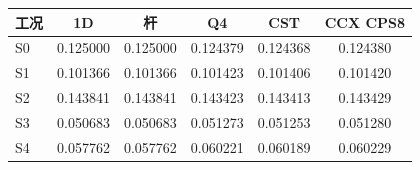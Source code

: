 \begin{tabular}{@{}lS[table-format=1.6]S[table-format=1.6]S[table-format=1.6]S[table-format=1.6]S[table-format=1.6]@{}}
\toprule
工况 & {1D} & {杆} & {Q4} & {CST} & {CCX CPS8} \\
\midrule
S0 & 0.125000 & 0.125000 & 0.124379 & 0.124368 & 0.124380 \\
S1 & 0.101366 & 0.101366 & 0.101423 & 0.101406 & 0.101420 \\
S2 & 0.143841 & 0.143841 & 0.143423 & 0.143413 & 0.143429 \\
S3 & 0.050683 & 0.050683 & 0.051273 & 0.051253 & 0.051280 \\
S4 & 0.057762 & 0.057762 & 0.060221 & 0.060189 & 0.060229 \\
\bottomrule
\end{tabular}
